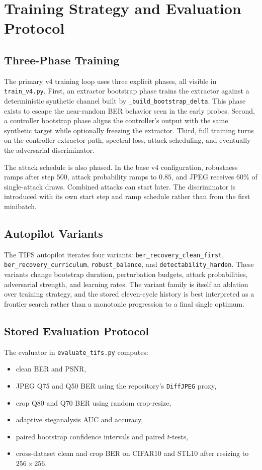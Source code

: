 \documentclass[journal]{IEEEtran}
\begin{document}
\section{Training Strategy and Evaluation Protocol}
\subsection{Three-Phase Training}
The primary v4 training loop uses three explicit phases, all visible in \texttt{train\_v4.py}. First, an extractor bootstrap phase trains the extractor against a deterministic synthetic channel built by \texttt{\_build\_bootstrap\_delta}. This phase exists to escape the near-random BER behavior seen in the early probes. Second, a controller bootstrap phase aligns the controller's output with the same synthetic target while optionally freezing the extractor. Third, full training turns on the controller-extractor path, spectral loss, attack scheduling, and eventually the adversarial discriminator.

The attack schedule is also phased. In the base v4 configuration, robustness ramps after step $500$, attack probability ramps to $0.85$, and JPEG receives $60\%$ of single-attack draws. Combined attacks can start later. The discriminator is introduced with its own start step and ramp schedule rather than from the first minibatch.

\subsection{Autopilot Variants}
The TIFS autopilot iterates four variants: \texttt{ber\_recovery\_clean\_first}, \texttt{ber\_recovery\_curriculum}, \texttt{robust\_balance}, and \texttt{detectability\_harden}. These variants change bootstrap duration, perturbation budgets, attack probabilities, adversarial strength, and learning rates. The variant family is itself an ablation over training strategy, and the stored eleven-cycle history is best interpreted as a frontier search rather than a monotonic progression to a final single optimum.

\subsection{Stored Evaluation Protocol}
The evaluator in \texttt{evaluate\_tifs.py} computes:
\begin{itemize}
    \item clean BER and PSNR,
    \item JPEG Q75 and Q50 BER using the repository's \texttt{DiffJPEG} proxy,
    \item crop Q80 and Q70 BER using random crop-resize,
    \item adaptive steganalysis AUC and accuracy,
    \item paired bootstrap confidence intervals and paired $t$-tests,
    \item cross-dataset clean and crop BER on CIFAR10 and STL10 after resizing to $256\times256$.
\end{itemize}
\end{document}
